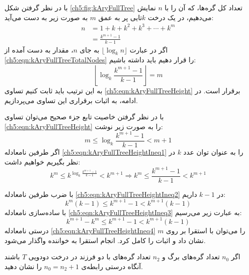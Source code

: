با در نظر گرفتن شکل {\eqref{ch5:fig:kAryFullTree}} تعداد کل گره‌ها، که آن را با {$n$} نمایش می‌دهیم، در یک درخت {$k$}تایی پر به عمق {$m$} به صورت زیر به دست می‌آید:
\begin{align}
n &= 1+k+k^2+k^3+\cdots + k^m\nonumber\\
   &=\frac{k^{m+1}-1}{k-1}\label{ch5:eqn:kAryFullTreeTotalNodes}
\end{align}
اگر در عبارت {$\lfloor \log_k n \rfloor$} به جای {$n$}، مقدار به دست آمده از {\eqref{ch5:eqn:kAryFullTreeTotalNodes}} را قرار دهیم باید داشته باشیم:
\begin{equation}
\left\lfloor \log_k \frac{k^{m+1}-1}{k-1} \right\rfloor = m\label{ch5:eqn:kAryFullTreeHeight}
\end{equation}
به این ترتیب باید ثابت کنیم تساوی {\eqref{ch5:eqn:kAryFullTreeHeight}} برقرار است. در ادامه، به اثبات برقراری این تساوی می‌پردازیم.

با در نظر گرفتن خاصیت تابع جزء صحیح می‌توان تساوی {\eqref{ch5:eqn:kAryFullTreeHeight}} را به صورت زیر نوشت:
\begin{equation}
m \leq \log_k \frac{k^{m+1}-1}{k-1} < m+1\label{ch5:eqn:kAryFullTreeHeightIneq1}
\end{equation}
اگر طرفین نامعادله {\eqref{ch5:eqn:kAryFullTreeHeightIneq1}} را به عنوان توان عدد {$k$} در نظر بگیریم خواهیم داشت:
\begin{equation}
k^m \leq k^{\log_k \frac{k^{m+1}-1}{k-1}} < k^{m+1} \Rightarrow k^m \leq \frac{k^{m+1}-1}{k-1} < k^{m+1}\label{ch5:eqn:kAryFullTreeHeightIneq2}
\end{equation}

با ضرب طرفین نامعادله {\eqref{ch5:eqn:kAryFullTreeHeightIneq2}} در {$k-1$} داریم:
\begin{equation}
k^m(k-1) \leq k^{m+1}-1 < k^{m+1}(k-1)\label{ch5:eqn:kAryFullTreeHeightIneq3}
\end{equation}
با ساده‌سازی نامعادله {\eqref{ch5:eqn:kAryFullTreeHeightIneq3}} به عبارت زیر می‌رسیم:
\begin{equation}
k^{m+1}-k^m \leq k^{m+1}-1 < k^{m+1}(k-1)\label{ch5:eqn:kAryFullTreeHeightIneq4}
\end{equation}
درستی نامعادله {\eqref{ch5:eqn:kAryFullTreeHeightIneq4}} را می‌توان با استقرا بر روی {$m$} نشان داد و اثبات را کامل کرد. انجام استقرا به خواننده واگذار می‌شود.

 اگر {$n_0$} تعداد گره‌های برگ و {$n_2$} تعداد گره‌های با دو فرزند در درخت دودویی {$T$} باشند آنگاه درستی رابطه‌ی {$n_0=n_2+1$} را نشان دهید.


